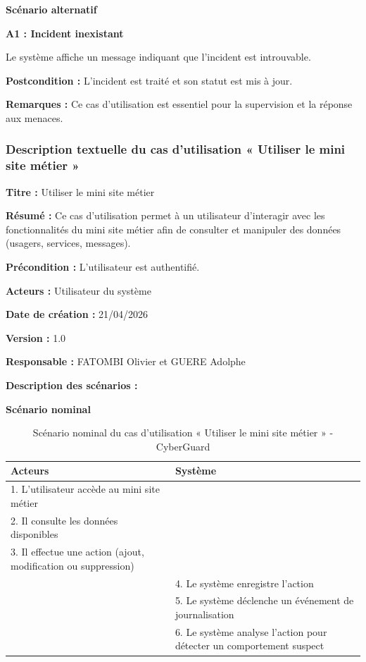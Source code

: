 \documentclass[a4paper,12pt]{report}
\begin{document}
    \textbf{Scénario alternatif}
    
    \textbf{A1 : Incident inexistant}
      
    Le système affiche un message indiquant que l’incident est introuvable.
    
    \textbf{Postcondition :}  
    L’incident est traité et son statut est mis à jour.
    
    \textbf{Remarques :}  
    Ce cas d’utilisation est essentiel pour la supervision et la réponse aux menaces.
    
    \subsubsection{Description textuelle du cas d’utilisation « Utiliser le mini site métier »}
    
    \textbf{Titre :} Utiliser le mini site métier  
    
    \textbf{Résumé :}  
    Ce cas d’utilisation permet à un utilisateur d’interagir avec les fonctionnalités du mini site métier afin de consulter et manipuler des données (usagers, services, messages).
    
    \textbf{Précondition :}  
    L’utilisateur est authentifié.
    
    \textbf{Acteurs :}  
    Utilisateur du système
    
    \textbf{Date de création :} 21/04/2026  
    
    \textbf{Version :} 1.0  
    
    \textbf{Responsable :} FATOMBI Olivier et GUERE Adolphe
    
    \textbf{Description des scénarios :}
    
    \textbf{Scénario nominal}
    
    \begin{table}[H]
        \centering
        \begin{tabular}{|p{6cm}|p{6cm}|}
            \hline
            \textbf{Acteurs} & \textbf{Système} \\
            \hline
            1. L’utilisateur accède au mini site métier & \\
            2. Il consulte les données disponibles & \\
            3. Il effectue une action (ajout, modification ou suppression) & \\
            \hline
            & 4. Le système enregistre l’action \\
            & 5. Le système déclenche un événement de journalisation \\
            & 6. Le système analyse l’action pour détecter un comportement suspect \\
            \hline
        \end{tabular}
        \caption{Scénario nominal du cas d’utilisation « Utiliser le mini site métier » - CyberGuard}
    \end{table}
    
\end{document}
